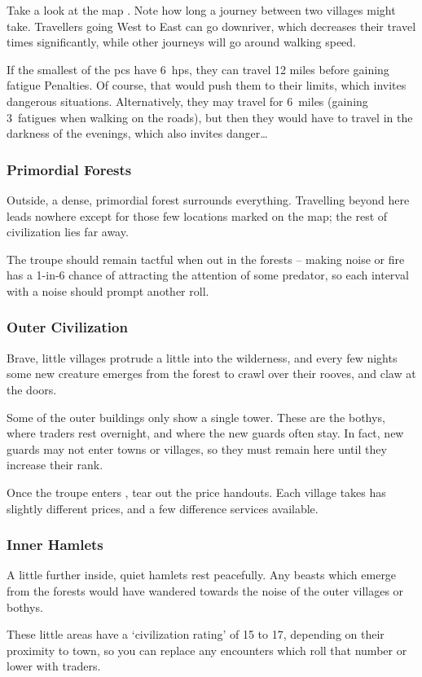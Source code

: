 \begin{multicols}{2}
Take a look at the map .
Note how long a journey between two \glspl{village} might take.
Travellers going West to East can go downriver, which decreases their travel times significantly, while other journeys will go around walking speed.

If the smallest of the \glspl{pc} have 6~\glspl{hp}, they can travel 12 miles before gaining \gls{fatigue} Penalties.
Of course, that would push them to their limits, which invites dangerous situations.
Alternatively, they may travel for 6~miles (gaining 3~\glspl{fatigue} when walking on the roads), but then they would have to travel in the darkness of the evenings, which also invites danger\ldots

\subsubsection{Primordial Forests}
Outside, a dense, primordial forest surrounds everything.
Travelling beyond here leads nowhere except for those few locations marked on the map; the rest of civilization lies far away.

The troupe should remain tactful when out in the forests -- making noise or fire has a 1-in-6 chance of attracting the attention of some predator, so each \gls{interval} with a noise should prompt another roll.

\subsubsection{Outer Civilization}
Brave, little \glspl{village} protrude a little into the wilderness, and every few nights some new creature emerges from the forest to crawl over their rooves, and claw at the doors.

Some of the outer buildings only show a single tower.
These are the \glspl{bothy}, where traders rest overnight, and where the new \glspl{guard} often stay.
In fact, new \glspl{guard} may not enter towns or \glspl{village}, so they must remain here until they increase their rank.%

Once the troupe enters , tear out the price handouts.
Each \gls{village} takes has slightly different prices, and a few difference services available.

\subsubsection{Inner Hamlets}
A little further inside, quiet hamlets rest peacefully.
Any beasts which emerge from the forests would have wandered towards the noise of the outer \glspl{village} or \glspl{bothy}.

These little areas have a `civilization rating' of 15 to 17, depending on their proximity to town, so you can replace any encounters which roll that number or lower with traders.%

\end{multicols}

